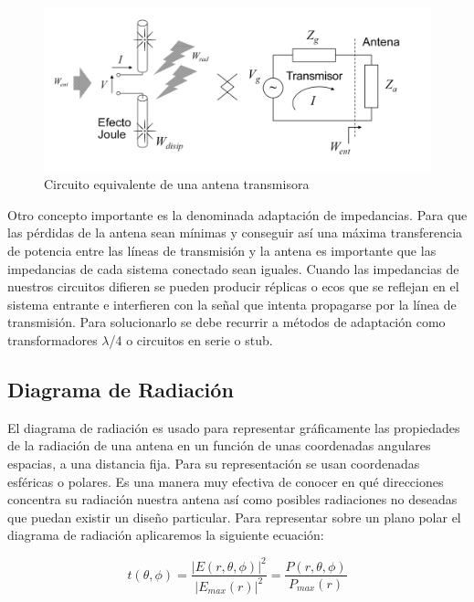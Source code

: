 \begin{figure}[h]
    \centering
        \includegraphics[width=15cm]{archivos/impedancia}
        \caption{Circuito equivalente de una antena transmisora}
        \label{fig:impedancia}
\end{figure}

\par Otro concepto importante es la denominada adaptación de impedancias. Para que las pérdidas de la antena sean mínimas y conseguir así una máxima transferencia de potencia entre las líneas de transmisión y la antena es importante que las impedancias de cada sistema conectado sean iguales. Cuando las impedancias de nuestros circuitos difieren se pueden producir réplicas o ecos que se reflejan en el sistema entrante e interfieren con la señal que intenta propagarse por la línea de transmisión. Para solucionarlo se debe recurrir a métodos de adaptación como transformadores $\lambda$/4 o circuitos en serie o stub.

\subsection{Diagrama de Radiación}

\par El diagrama de radiación es usado para representar gráficamente las propiedades de la radiación de una antena en un función de unas coordenadas angulares espacias, a una distancia fija. Para su representación se usan coordenadas esféricas o polares. Es una manera muy efectiva de conocer en qué direcciones concentra su radiación nuestra antena así como posibles radiaciones no deseadas que puedan existir un diseño particular. Para representar sobre un plano polar el diagrama de radiación aplicaremos la siguiente ecuación:

\begin{equation}
	t(\theta, \phi )=\frac{\left | E(r, \theta, \phi ) \right |^2}{\left | E_{max}(r) \right |^2}= \frac{P(r,\theta ,\phi)}{P_{max}(r)}
	\label{eq:diagramarad}
\end{equation}

